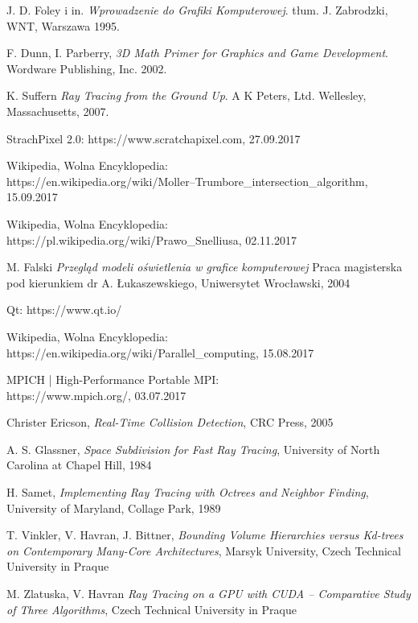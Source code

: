 \documentclass[12pt]{report}
\begin{document}
\begin{thebibliography}{9}

  J. D. Foley i in.
  \emph{Wprowadzenie do Grafiki Komputerowej}.
  tłum. J. Zabrodzki,
  WNT, Warszawa
  1995.
  
  F. Dunn, I. Parberry,
  \emph{3D Math Primer for Graphics and Game Development}.
  Wordware Publishing, Inc.
  2002.
  
	K. Suffern
	\emph{Ray Tracing from the Ground Up}.
	A K Peters, Ltd.
	Wellesley, Massachusetts,
	2007.
	
	StrachPixel 2.0:
	https://www.scratchapixel.com, 27.09.2017
	
	Wikipedia, Wolna Encyklopedia:\\ 
	https://en.wikipedia.org/wiki/Moller–Trumbore\_intersection\_algorithm, 15.09.2017
	
	
	Wikipedia, Wolna Encyklopedia:\\ 
	https://pl.wikipedia.org/wiki/Prawo\_Snelliusa,
	02.11.2017
	
	
	M. Falski
	\emph{Przegląd modeli oświetlenia w grafice komputerowej}
	Praca magisterska pod kierunkiem dr A. Łukaszewskiego,
	Uniwersytet Wrocławski,
	2004
	
	Qt: https://www.qt.io/
	
	Wikipedia, Wolna Encyklopedia:\\ 
	https://en.wikipedia.org/wiki/Parallel\_computing, 15.08.2017
	
	MPICH | High-Performance Portable MPI: \\
	https://www.mpich.org/, 03.07.2017


	Christer Ericson,
	\emph{Real-Time Collision Detection},
	CRC Press, 2005
	

	A. S. Glassner,
	\emph{Space Subdivision for Fast Ray Tracing},
	University of North Carolina at Chapel Hill,
	1984

	H. Samet,
	\emph{Implementing Ray Tracing with Octrees and Neighbor Finding},
	University of Maryland,
	Collage Park, 1989
	
	T. Vinkler, V. Havran, J. Bittner,
	\emph{Bounding Volume Hierarchies versus Kd-trees on Contemporary Many-Core Architectures},
	Marsyk University, Czech Technical University in Praque

	
	M. Zlatuska, V. Havran
	\emph{Ray Tracing on a GPU with CUDA –
Comparative Study of Three Algorithms},
	Czech Technical University in Praque
	

\end{thebibliography}
\end{document}
